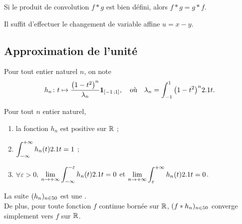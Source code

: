 \begin{theo}
Si le produit de convolution $f \ast g$ est bien défini, alors $f \ast g = g \ast f$.
\end{theo}

\begin{demo}
Il suffit d'effectuer le changement de variable affine $u = x - y$.
\end{demo}


\begin{comment}
\todoinline{Ajouter un support compact pour avoir Fubini ?}

\begin{theo}{}
\[
\mathcal{L}(f \ast g) = \mathcal{L}(f) \mathcal{L}(g)
\]
\end{theo}

\end{comment}

\subsection{Approximation de l'unité}


Pour tout entier naturel $n$, on note
\[
\fonctionligne[h_n]{t}{\frac{\big(1 - t^2\big)^n}{\lambda_n} \indicatrice{\interff{-1}{1}}},
\quad
\text{où}
\quad \lambda_n = \displaystyle\int_{-1}^1 \big(1 - t^2\big)^n \d t.
\]


\begin{theo}
Pour tout $n$ entier naturel,
\begin{enumerate}
\item la fonction $h_n$ est positive sur $\R$ ;
\item $\displaystyle \int_{-\infty}^{+\infty} h_n(t) \d t = 1$ ;
\item $\forall \varepsilon > 0$, $\displaystyle\lim_{n\to+\infty} \int_{-\infty}^{-\varepsilon} h_n(t) \d t = 0$ et $\displaystyle\lim_{n\to+\infty} \int_{\varepsilon}^{+\infty} h_n(t) \d t = 0$.
\end{enumerate}
La suite $(h_n)_{n \in \N}$ est une . \\
\noindent De plus, pour toute fonction $f$ continue bornée sur $\R$, $(f \ast h_n)_{n\in\N}$ converge simplement vers $f$ sur $\R$.
\end{theo}

